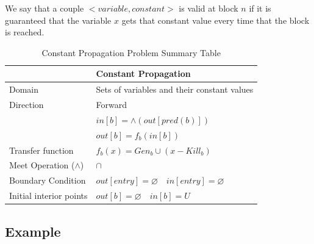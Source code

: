\documentclass{article}
\begin{document}
We say that a couple $<variable, constant>$ is valid at block $n$ if it is guaranteed that the variable $x$ gets that constant value every time that the block is reached.

\begin{table}[H]
	\centering
	\begin{tabular}{|p{}|p{}|}
		\hline
		                          & \textbf{Constant Propagation}                            \\
		\hline
		Domain                    & Sets of variables and their constant values              \\
		\hline
		Direction                 & Forward                                                  \\
		                          & $in[b] = \wedge(out[pred(b)])$                           \\
		                          & $out[b] = f_b(in[b])$                                    \\
		\hline
		Transfer function         & $f_b(x) = Gen_b \cup (x - Kill_b)$                       \\
		\hline
		Meet Operation ($\wedge$) & $\cap$                                                   \\
		\hline
		Boundary Condition        & $out[entry] = \varnothing \quad in[entry] = \varnothing$ \\
		\hline
		Initial interior points   & $out[b] = \varnothing \quad in[b] = U$                   \\
		\hline
	\end{tabular}
	\caption{Constant Propagation Problem Summary Table}
	\label{tab:dataflow_problem_x}
\end{table}

\subsection{Example}
\end{document}
